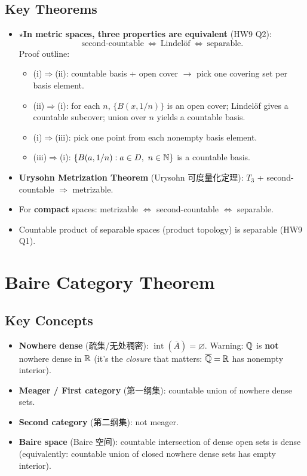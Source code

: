 \documentclass{article}
\newcommand{\starKey}{\textcolor{red!65!black}{\textbf{$\star$}}}
\begin{document}
\subsection{Key Theorems}

\begin{itemize}
  \item \starKey \textbf{In metric spaces, three properties are equivalent} (HW9 Q2):
  \[
    \text{second-countable}\ \iff\ \text{Lindel\"of}\ \iff\ \text{separable}.
  \]
  Proof outline:
  \begin{itemize}
    \item (i)$\Rightarrow$(ii): countable basis + open cover $\to$
    pick one covering set per basis element.
    \item (ii)$\Rightarrow$(i): for each $n$, $\{B(x,1/n)\}$ is an open cover;
    Lindel\"of gives a countable subcover; union over $n$ yields a countable basis.
    \item (i)$\Rightarrow$(iii): pick one point from each nonempty basis element.
    \item (iii)$\Rightarrow$(i): $\{B(a,1/n):a\in D,\ n\in\mathbb{N}\}$ is a countable basis.
  \end{itemize}

  \item \textbf{Urysohn Metrization Theorem} (Urysohn 可度量化定理):
  $T_3$ + second-countable $\Rightarrow$ metrizable.

  \item For \textbf{compact} spaces: metrizable $\iff$ second-countable $\iff$ separable.

  \item Countable product of separable spaces (product topology) is separable (HW9 Q1).
\end{itemize}

\section{Baire Category Theorem}

\subsection{Key Concepts}

\begin{itemize}
  \item \textbf{Nowhere dense} (疏集/无处稠密): $\operatorname{int}(\overline{A})=\varnothing$.
  Warning: $\mathbb{Q}$ is \textbf{not} nowhere dense in $\mathbb{R}$ (it's the \emph{closure} that matters:
  $\overline{\mathbb{Q}}=\mathbb{R}$ has nonempty interior).
  \item \textbf{Meager / First category} (第一纲集): countable union of nowhere dense sets.
  \item \textbf{Second category} (第二纲集): not meager.
  \item \textbf{Baire space} (Baire 空间): countable intersection of dense open sets is dense
  (equivalently: countable union of closed nowhere dense sets has empty interior).
\end{itemize}
\end{document}
